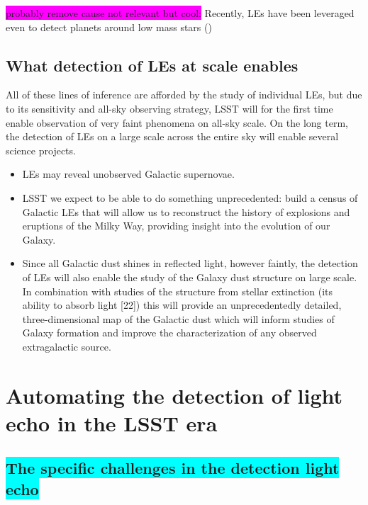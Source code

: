 \documentclass{proposalnsf}
\newcommand{\armin}[1]{\colorbox{cyan}{#1}}
\newcommand{\changeit}[1]{\colorbox{magenta}{#1}}
\begin{document}
\changeit{probably remove cause not relevant but cool:} Recently, LEs have been leveraged even to detect planets around low mass stars (\citep{sparks2018})

\subsection{What detection of LEs at scale enables}
All of these lines of inference are afforded by the study of individual LEs, but due to its sensitivity and all-sky observing strategy, LSST will for the first time enable observation of very faint phenomena on all-sky scale.  
On the long term, the detection of LEs on a large scale across the entire sky will enable several science projects.

\begin{itemize}
  \item 
LEs may reveal unobserved Galactic supernovae.  
 \item 
LSST we expect to be able to do something unprecedented: build a census of Galactic LEs that will allow us to reconstruct the history of explosions and eruptions of the Milky Way, providing insight into the evolution of our Galaxy.   
\item Since all Galactic dust shines in reflected light, however faintly, the detection of LEs will also enable the study of the Galaxy dust structure on large scale.   In combination with studies of the structure from stellar extinction (its ability to absorb light [22]) this will provide an unprecedentedly detailed, three-dimensional map of the Galactic dust which will inform studies of Galaxy formation and improve the characterization of any observed extragalactic source.  
\end{itemize}

\section{Automating the detection of light echo in the LSST era}

\subsection{\armin{The specific challenges in the detection light echo}}
\end{document}
